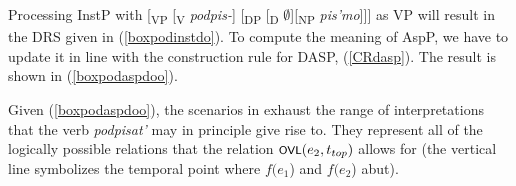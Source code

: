 \documentclass[output=paper,colorlinks,citecolor=brown]{langscibook}
\begin{document}
Processing InstP with [\textsubscript{VP} [\textsubscript{V} \textit{podpis-}] [\textsubscript{DP} [\textsubscript{D} $\emptyset$][\textsubscript{NP} \textit{pis'mo}]]] as VP will result in the DRS given in (\ref{boxpodinstdo}). To compute the meaning of AspP, we have to update it in line with the construction rule for DASP, (\ref{CRdasp}). The result is shown in (\ref{boxpodaspdoo}).


\noindent Given (\ref{boxpodaspdoo}), the scenarios in  exhaust the range of interpretations that the verb \textit{podpisat'} may in principle give rise to.
They represent all of the logically possible
relations that the relation $\cnst{ovl}(e_2,t_{top})$ allows for
(the vertical line symbolizes the temporal point where $f(e_1$) and $f(e_2$) abut). 
\end{document}
